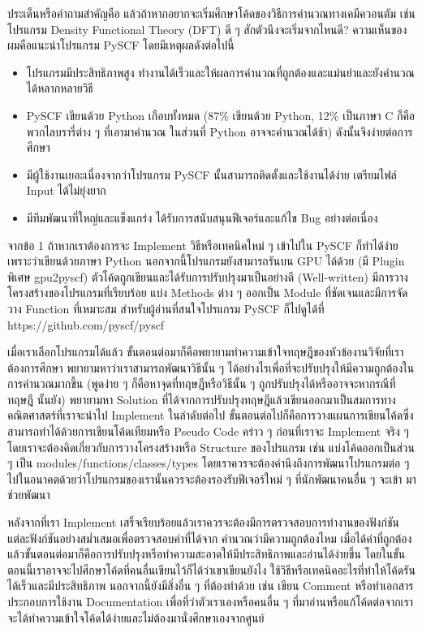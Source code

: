 ประเด็นหรือคำถามสำคัญคือ แล้วถ้าหากอยากจะเริ่มศึกษาโค้ดของวิธีการคำนวณทางเคมีควอนตัม เช่น โปรแกรม Density Functional Theory 
(DFT) ดี ๆ สักตัวนึงจะเริ่มจากไหนดี? ความเห็นของผมคือแนะนำโปรแกรม PySCF โดยมีเหตุผลดังต่อไปนี้

\begin{itemize}
    \item โปรแกรมมีประสิทธิภาพสูง ทำงานได้เร็วและให้ผลการคำนวณที่ถูกต้องและแม่นยำและยังคำนวณได้หลากหลายวิธี
    \item PySCF เขียนด้วย Python เกือบทั้งหมด (87\% เขียนด้วย Python, 12\% เป็นภาษา C ก็คือพวกไลบรารี่ต่าง ๆ ที่เอามาคำนวณ%
    ในส่วนที่ Python อาจจะคำนวณได้ช้า) ดังนั้นจึงง่ายต่อการศึกษา
    \item มีผู้ใช้งานเยอะเนื่องจากว่าโปรแกรม PySCF นั้นสามารถติดตั้งและใช้งานได้ง่าย เตรียมไฟล์ Input ได้ไม่ยุ่งยาก 
    \item มีทีมพัฒนาที่ใหญ่และแข็งแกร่ง ได้รับการสนับสนุนฟีเจอร์และแก้ไข Bug อย่างต่อเนื่อง
\end{itemize}
    
\noindent จากข้อ 1 ถ้าหากเราต้องการจะ Implement วิธีหรือเทคนิคใหม่ ๆ เข้าไปใน PySCF ก็ทำได้ง่ายเพราะว่าเขียนด้วยภาษา Python 
นอกจากนี้โปรแกรมยังสามารถรันบน GPU ได้ด้วย (มี Plugin พิเศษ gpu2pyscf) ตัวโค้ดถูกเขียนและได้รับการปรับปรุงมาเป็นอย่างดี (Well-written) 
มีการวางโครงสร้างของโปรแกรมที่เรียบร้อย แบ่ง Methods ต่าง ๆ ออกเป็น Module ที่ชัดเจนและมีการจัดวาง Function ที่เหมาะสม 
สำหรับผู้อ่านที่สนใจโปรแกรม PySCF ก็ไปดูได้ที่ https://github.com/pyscf/pyscf

เมื่อเราเลือกโปรแกรมได้แล้ว ขั้นตอนต่อมาก็คือพยายามทำความเข้าใจทฤษฎีของหัวข้องานวิจัยที่เราต้องการศึกษา พยายามหาว่าเราสามารถพัฒนาวิธีนั้น ๆ 
ได้อย่างไรเพื่อที่จะปรับปรุงให้มีความถูกต้องในการคำนวณมากขึ้น (พูดง่าย ๆ ก็คือหาจุดที่ทฤษฎีหรือวิธีนั้น ๆ ถูกปรับปรุงได้หรืออาจจะหากรณีที่ทฤษฎี%
นั้นยัง) พยายามหา Solution ที่ได้จากการปรับปรุงทฤษฎีแล้วเขียนออกมาเป็นสมการทางคณิตศาสตร์ที่เราจะนำไป Implement ในลำดับต่อไป
ขั้นตอนต่อไปก็คือการวางแผนการเขียนโค้ดซึ่งสามารถทำได้ด้วยการเขียนโค้ดเทียมหรือ Pseudo Code คร่าว ๆ ก่อนที่เราจะ Implement จริง ๆ 
โดยเราจะต้องคิดเกี่ยวกับการวางโครงสร้างหรือ Structure ของโปรแกรม เช่น แบ่งโค้ดออกเป็นส่วน ๆ เป็น modules/functions/classes/types 
โดยเราควรจะต้องคำนึงถึงการพัฒนาโปรแกรมต่อ ๆ ไปในอนาคตด้วยว่าโปรแกรมของเรานั้นควรจะต้องรองรับฟีเจอร์ใหม่ ๆ ที่นักพัฒนาคนอื่น ๆ จะเข้า%
มาช่วยพัฒนา 

หลังจากที่เรา Implement เสร็จเรียบร้อยแล้วเราควรจะต้องมีการตรวจสอบการทำงานของฟังก์ชันแต่ละฟังก์ชันอย่างสม่ำเสมอเพื่อตรวจสอบค่าที่ได้จาก%
คำนวณว่ามีความถูกต้องไหม เมื่อได้ค่าที่ถูกต้องแล้วขั้นตอนต่อมาก็คือการปรับปรุงหรือทำความสะอาดให้มีประสิทธิภาพและอ่านได้ง่ายขึ้น 
โดยในขั้นตอนนี้เราอาจจะไปศึกษาโค้ดที่คนอื่นเขียนไว้ก็ได้ว่าเขาเขียนยังไง ใช้วิธีหรือเทคนิคอะไรที่ทำให้โค้ดรันได้เร็วและมีประสิทธิภาพ 
นอกจากนี้ยังมีสิ่งอื่น ๆ ที่ต้องทำด้วย เช่น เขียน Comment หรือทำเอกสารประกอบการใช้งาน Documentation เพื่อที่ว่าตัวเราเองหรือคนอื่น ๆ 
ที่มาอ่านหรือแก้โค้ดต่อจากเราจะได้ทำความเข้าใจโค้ดได้ง่ายและไม่ต้องมานั่งศึกษาเองจากศูนย์
